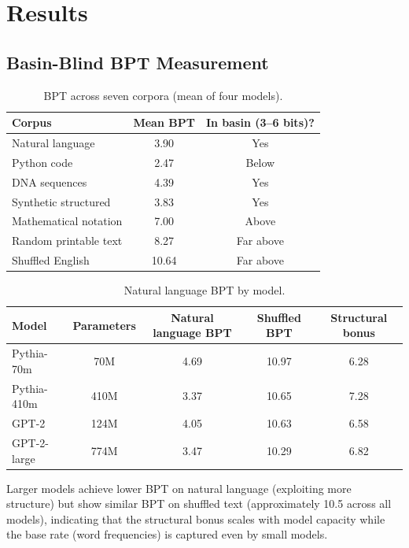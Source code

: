 \documentclass[11pt]{article}
\begin{document}
\section{Results}

\subsection{Basin-Blind BPT Measurement}

\begin{table}[ht]
\centering
\caption{BPT across seven corpora (mean of four models).}
\begin{tabular}{lcc}
\toprule
Corpus & Mean BPT & In basin (3--6 bits)? \\
\midrule
Natural language & 3.90 & Yes \\
Python code & 2.47 & Below \\
DNA sequences & 4.39 & Yes \\
Synthetic structured & 3.83 & Yes \\
Mathematical notation & 7.00 & Above \\
Random printable text & 8.27 & Far above \\
Shuffled English & 10.64 & Far above \\
\bottomrule
\end{tabular}
\label{tab:bpt}
\end{table}

\begin{table}[ht]
\centering
\caption{Natural language BPT by model.}
\begin{tabular}{lcccc}
\toprule
Model & Parameters & Natural language BPT & Shuffled BPT & Structural bonus \\
\midrule
Pythia-70m & 70M & 4.69 & 10.97 & 6.28 \\
Pythia-410m & 410M & 3.37 & 10.65 & 7.28 \\
GPT-2 & 124M & 4.05 & 10.63 & 6.58 \\
GPT-2-large & 774M & 3.47 & 10.29 & 6.82 \\
\bottomrule
\end{tabular}
\label{tab:bptmodel}
\end{table}

Larger models achieve lower BPT on natural language (exploiting more structure) but show similar BPT on shuffled text (approximately 10.5 across all models), indicating that the structural bonus scales with model capacity while the base rate (word frequencies) is captured even by small models.
\end{document}

